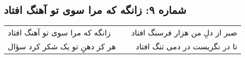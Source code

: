 \begin{center}
\section*{شماره ۹: زانگه که مرا سوی تو آهنگ افتاد}
\label{sec:009}
\begin{longtable}{l p{0.5cm} r}
زانگه که مرا سوی تو آهنگ افتاد
&&
صبر از دلِ من هزار فرسنگ افتاد
\\
هر کز دهنِ تو یک شکر کرد سؤال
&&
تا در نگریست در دمی تنگ افتاد
\\
\end{longtable}
\end{center}
